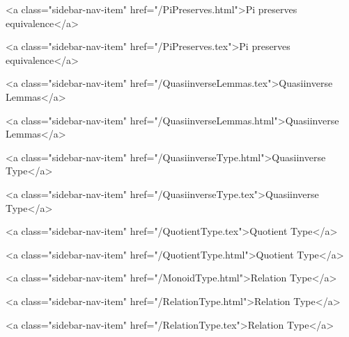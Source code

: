           <a class="sidebar-nav-item" href="/PiPreserves.html">Pi preserves equivalence</a>
        
      
    
      
        
          <a class="sidebar-nav-item" href="/PiPreserves.tex">Pi preserves equivalence</a>
        
      
    
      
        
          <a class="sidebar-nav-item" href="/QuasiinverseLemmas.tex">Quasiinverse Lemmas</a>
        
      
    
      
        
          <a class="sidebar-nav-item" href="/QuasiinverseLemmas.html">Quasiinverse Lemmas</a>
        
      
    
      
        
          <a class="sidebar-nav-item" href="/QuasiinverseType.html">Quasiinverse Type</a>
        
      
    
      
        
          <a class="sidebar-nav-item" href="/QuasiinverseType.tex">Quasiinverse Type</a>
        
      
    
      
        
          <a class="sidebar-nav-item" href="/QuotientType.tex">Quotient Type</a>
        
      
    
      
        
          <a class="sidebar-nav-item" href="/QuotientType.html">Quotient Type</a>
        
      
    
      
        
          <a class="sidebar-nav-item" href="/MonoidType.html">Relation Type</a>
        
      
    
      
        
          <a class="sidebar-nav-item" href="/RelationType.html">Relation Type</a>
        
      
    
      
        
          <a class="sidebar-nav-item" href="/RelationType.tex">Relation Type</a>
        
      
    
